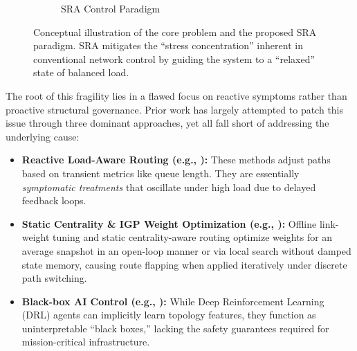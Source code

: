 \documentclass[journal]{IEEEtran}
\theoremstyle{plain}
\theoremstyle{definition}
\newcommand{\rev}[1]{{\color{blue}#1}}
\begin{document}
\begin{figure}[t!]
\begin{subfigure}[b]{0.48\columnwidth}
        \caption{SRA Control Paradigm}
        \label{fig:intro_after}
    \end{subfigure}
    
    \caption{Conceptual illustration of the core problem and the proposed SRA paradigm. SRA mitigates the ``stress concentration'' inherent in conventional network control by guiding the system to a ``relaxed'' state of balanced load.}
    \label{fig:intro_scenario}
\end{figure}

The root of this fragility lies in a flawed focus on reactive symptoms rather than proactive structural governance. 
Prior work has largely attempted to patch this issue through \rev{three} dominant approaches, yet all fall short of addressing the underlying cause:
\begin{itemize}
    \item \textbf{Reactive Load-Aware Routing (e.g., \cite{Macabale2020Cradle}):} These methods adjust paths based on transient metrics like queue length. They are essentially \textit{symptomatic treatments} that oscillate under high load due to delayed feedback loops.
    \item \rev{\textbf{Static Centrality \& IGP Weight Optimization (e.g., \cite{Fortz2000OSPF, Upadhyay2024OpticalBC}):} Offline link-weight tuning and static centrality-aware routing optimize weights for an average snapshot in an open-loop manner or via local search without damped state memory, causing route flapping when applied iteratively under discrete path switching.}
    \item \textbf{Black-box AI Control (e.g., \cite{Wei2023GRLPS}):} While Deep Reinforcement Learning (DRL) agents can implicitly learn topology features, they function as uninterpretable ``black boxes,'' lacking the safety guarantees required for mission-critical infrastructure.
\end{itemize}
\end{document}

